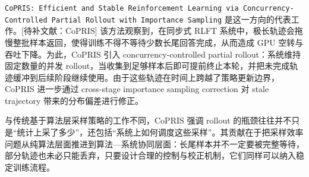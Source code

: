 \texttt{CoPRIS: Efficient and Stable Reinforcement Learning via Concurrency-Controlled Partial Rollout with Importance Sampling} 是这一方向的代表工作。[待补文献：CoPRIS] 该方法观察到，在同步式 RLFT 系统中，极长轨迹会拖慢整批样本返回，使得训练不得不等待少数长尾回答完成，从而造成 GPU 空转与吞吐下降。为此，CoPRIS 引入 concurrency-controlled partial rollout：系统维持固定数量的并发 rollout，当收集到足够样本后即可提前终止本轮，并把未完成轨迹缓冲到后续阶段继续使用。由于这些轨迹在时间上跨越了策略更新边界，CoPRIS 进一步通过 cross-stage importance sampling correction 对 stale trajectory 带来的分布偏差进行修正。

与传统基于算法层采样策略的工作不同，CoPRIS 强调 rollout 的瓶颈往往并不只是“统计上采了多少”，还包括“系统上如何调度这些采样”。其贡献在于把采样效率问题从纯算法层面推进到算法—系统协同层面：长尾样本并不一定要被完整等待，部分轨迹也未必只能丢弃，只要设计合理的控制与校正机制，它们同样可以纳入稳定训练流程。

